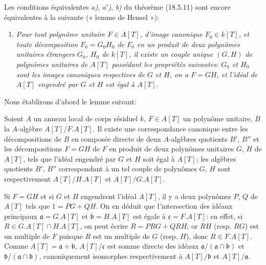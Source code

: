 \begin{remark}[18.5.13]
\label{IV.18.5.13}
Les conditions équivalentes \emph{a)}, \emph{a$'$)}, \emph{b)} du théorème (18.5.11) sont encore équivalentes à la suivante (« lemme de Hensel »):
\begin{enumerate}
  \item[\textup{a$''$)}] \itshape Pour tout polynôme unitaire $F\in A[T]$, d'image canonique $F_0\in k[T]$, et toute décomposition $F_0=G_0H_0$ de $F_0$ en un produit de deux polynômes unitaires \textup{étrangers} $G_0$, $H_0$ de $k[T]$, il existe un couple unique $(G,H)$ de polynômes unitaires de $A[T]$ possédant les propriétés suivantes: $G_0$ et $H_0$ sont les images canoniques respectives de $G$ et $H$, on a $F=GH$, et l'idéal de $A[T]$ engendré par $G$ et $H$ est égal à $A[T]$.
\end{enumerate}
\end{remark}

Nous établirons d'abord le lemme suivant:

\begin{lemma}[18.5.13.1]
\label{IV.18.5.13.1}
Soient $A$ un anneau local de corps résiduel $k$, $F\in A[T]$ un polynôme unitaire, $B$ la $A$-algèbre $A[T]/F.A[T]$. Il existe une correspondance canonique entre les décompositions de $B$ en composée directe de deux $A$-algèbres quotients $B'$, $B''$ et les décompositions $F=GH$ de $F$ en produit de deux polynômes unitaires $G$, $H$ de $A[T]$, tels que l'idéal engendré par $G$ et $H$ soit égal à $A[T]$; les algèbres quotients $B'$, $B''$ correspondant à un tel couple de polynômes $G$, $H$ sont respectivement $A[T]/H.A[T]$ et $A[T]/G.A[T]$.
\end{lemma}


Si $F=GH$ et si $G$ et $H$ engendrent l'idéal $A[T]$, il y a deux polynômes $P$, $Q$ de $A[T]$ tels que $1=PG+QH$. On en déduit que l'intersection des idéaux principaux $\mathfrak a=G.A[T]$ et $\mathfrak b=H.A[T]$ est égale à $\mathfrak c=F.A[T]$: en effet, si $R\in G.A[T]\cap H.A[T]$, on peut écrire $R=PRG+QRH$; or $RH$ (resp. $RG$) est un multiple de $F$ puisque $R$ est un multiple de $G$ (resp. $H$), donc $R\in F.A[T]$. Comme $A[T]=\mathfrak a+\mathfrak b$, $A[T]/\mathfrak c$ est somme directe des idéaux $\mathfrak a/(\mathfrak a\cap\mathfrak b)$ et $\mathfrak b/(\mathfrak a\cap\mathfrak b)$, canoniquement isomorphes respectivement à $A[T]/\mathfrak b$ et $A[T]/\mathfrak a$.

